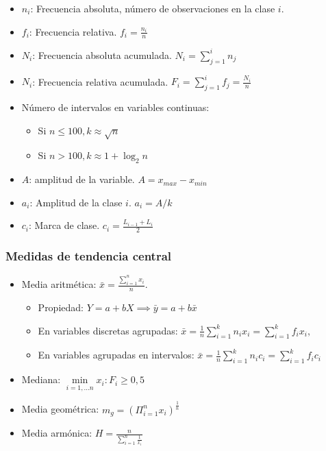 \documentclass[
]{article}
\providecommand{\tightlist}{%
  \setlength{\itemsep}{0pt}\setlength{\parskip}{0pt}}
\begin{document}
\begin{itemize}
\item
  \(n_i\): Frecuencia absoluta, número de observaciones en la clase
  \(i\).
\item
  \(f_i\): Frecuencia relativa. \(f_i = \frac{n_i}{n}\)
\item
  \(N_i\): Frecuencia absoluta acumulada.
  \(N_i = \sum\limits_{j=1}^{i}n_j\)
\item
  \(N_i\): Frecuencia relativa acumulada.
  \(F_i = \sum\limits_{j=1}^{i}f_j = \frac{N_i}{n}\)
\item
  Número de intervalos en variables continuas:

  \begin{itemize}
  \tightlist
  \item
    Si \(n \leq 100, k\approx\sqrt n\)
  \item
    Si \(n > 100, k\approx 1 + \log_2 n\)
  \end{itemize}
\item
  \(A\): amplitud de la variable. \(A = x_{max} - x_{min}\)
\item
  \(a_i\): Amplitud de la clase \(i\). \(a_i = A/k\)
\item
  \(c_i\): Marca de clase. \(c_i = \frac{L_{i-1} + L_{i}}{2}\)
\end{itemize}

\hypertarget{medidas-de-tendencia-central}{%
\subsubsection{Medidas de tendencia
central}\label{medidas-de-tendencia-central}}

\begin{itemize}
\item
  Media aritmética: \(\bar{x}= \frac{\sum\limits_{i=1}^n x_i}{n}\).

  \begin{itemize}
  \tightlist
  \item
    Propiedad: \(Y = a+ bX \implies \bar y = a + b \bar x\)
  \item
    En variables discretas agrupadas:
    \(\bar{x}= \frac{1}{n}\sum\limits_{i=1}^k n_i x_i= \sum\limits_{i=1}^k f_i x_i,\)
  \item
    En variables agrupadas en intervalos:
    \(\bar{x}= \frac{1}{n}\sum\limits_{i=1}^k n_i c_i= \sum\limits_{i=1}^k f_i c_i\)
  \end{itemize}
\item
  Mediana: \(\min\limits_{i=1,...n}{x_i}: F_i\geq 0{,}5\)
\item
  Media geométrica:
  \(m_g = \left ( \Pi_{i=1}^n x_i\right)^{\frac{1}{n}}\)
\item
  Media armónica: \(H = \frac{n}{\sum\limits_{i=1}^n\frac{ 1}{ x_i}}\)
\end{itemize}
\end{document}
